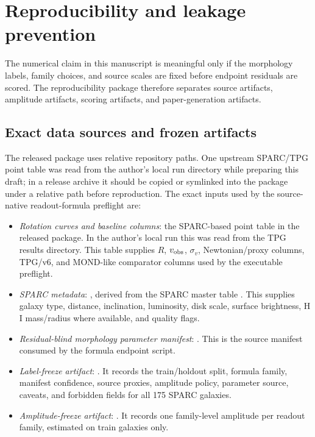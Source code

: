 \documentclass[11pt]{article}
\begin{document}
\section{Reproducibility and leakage prevention}
\label{sec:repro-leakage}

The numerical claim in this manuscript is meaningful only if the morphology
labels, family choices, and source scales are fixed before endpoint residuals
are scored.  The reproducibility package therefore separates source artifacts,
amplitude artifacts, scoring artifacts, and paper-generation artifacts.

\subsection{Exact data sources and frozen artifacts}

The released package uses relative repository paths.  One upstream SPARC/TPG
point table was read from the author's local run directory while preparing this
draft; in a release archive it should be copied or symlinked into the package
under a relative path before reproduction.  The exact inputs used by the
source-native readout-formula preflight are:
\begin{itemize}[leftmargin=*]
\item \emph{Rotation curves and baseline columns}: the SPARC-based point table
in the released package.  In the author's local run this was read from the TPG
results directory.
This table supplies \(R\), \(v_{\rm obs}\), \(\sigma_v\), Newtonian/proxy
columns, TPG/v6, and MOND-like comparator columns used by the executable
preflight.
\item \emph{SPARC metadata}: ,
derived from the SPARC master table \cite{Lelli2016SPARC}.  This supplies
galaxy type, distance, inclination, luminosity, disk scale, surface brightness,
H I mass/radius where available, and quality flags.
\item \emph{Residual-blind morphology parameter manifest}:
.  This is the source
manifest consumed by the formula endpoint script.
\item \emph{Label-freeze artifact}:
.  It records the
train/holdout split, formula family, manifest confidence, source proxies,
amplitude policy, parameter source, caveats, and forbidden fields for all 175
SPARC galaxies.
\item \emph{Amplitude-freeze artifact}:
.  It records
one family-level amplitude per readout family, estimated on train galaxies only.
\end{itemize}
\end{document}

